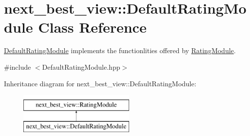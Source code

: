 \hypertarget{classnext__best__view_1_1DefaultRatingModule}{\section{next\-\_\-best\-\_\-view\-:\-:\-Default\-Rating\-Module \-Class \-Reference}
\label{classnext__best__view_1_1DefaultRatingModule}
}


\hyperlink{classnext__best__view_1_1DefaultRatingModule}{\-Default\-Rating\-Module} implements the functionlities offered by \hyperlink{classnext__best__view_1_1RatingModule}{\-Rating\-Module}.  




{\ttfamily \#include $<$\-Default\-Rating\-Module.\-hpp$>$}

\-Inheritance diagram for next\-\_\-best\-\_\-view\-:\-:\-Default\-Rating\-Module\-:\begin{figure}[H]
\begin{center}
\leavevmode
\includegraphics[height=2.000000cm]{classnext__best__view_1_1DefaultRatingModule}
\end{center}
\end{figure}
